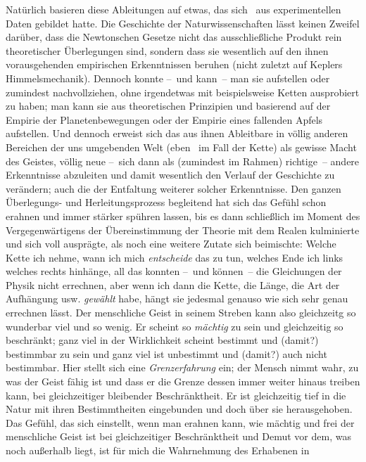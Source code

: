Natürlich basieren diese Ableitungen auf etwas, das sich \ua\ aus
  experimentellen Daten gebildet hatte.
Die Geschichte der Naturwissenschaften lässt keinen Zweifel darüber, dass
  die Newtonschen Gesetze nicht das ausschließliche Produkt rein theoretischer
  Überlegungen sind, sondern dass sie wesentlich auf den ihnen vorausgehenden
  empirischen Erkenntnissen beruhen (nicht zuletzt auf Keplers Himmelsmechanik).
Dennoch konnte --~und kann~-- man sie aufstellen oder zumindest nachvollziehen,
  ohne irgendetwas mit beispielsweise Ketten ausprobiert zu haben; man kann
  sie aus theoretischen Prinzipien und basierend auf der Empirie der
  Planetenbewegungen oder der Empirie eines fallenden Apfels aufstellen.
Und dennoch erweist sich das aus ihnen Ableitbare in völlig anderen Bereichen
  der uns umgebenden Welt (eben \zB\ im Fall der Kette) als gewisse Macht des
  Geistes, völlig neue --~sich dann als (zumindest im Rahmen) richtige~--
  andere Erkenntnisse abzuleiten und damit wesentlich den Verlauf der Geschichte
  zu verändern; auch die der Entfaltung weiterer solcher Erkenntnisse.
Den ganzen Überlegungs- und Herleitungsprozess begleitend hat sich das Gefühl
  schon erahnen und immer stärker spühren lassen, bis es dann schließlich im
  Moment des Vergegenwärtigens der Übereinstimmung der Theorie mit dem Realen
  kulminierte und sich voll ausprägte, als noch eine weitere Zutate sich
  beimischte:
Welche Kette ich nehme, wann ich mich \emph{entscheide} das zu tun, welches
  Ende ich links welches rechts hinhänge, all das konnten --~und können~-- die
  Gleichungen der Physik nicht errechnen, aber wenn ich dann die Kette, die
  Länge, die Art der Aufhängung usw. \emph{gewählt} habe, hängt sie jedesmal
  genauso wie sich sehr genau errechnen lässt.
Der menschliche Geist in seinem Streben kann also gleichzeitg so wunderbar
  viel und so wenig.
Er scheint so \emph{mächtig} zu sein und gleichzeitig so beschränkt; ganz viel
  in der Wirklichkeit scheint bestimmt und (damit?) bestimmbar zu sein und ganz
  viel ist unbestimmt und (damit?) auch nicht bestimmbar.
  Hier stellt sich eine \emph{Grenzerfahrung} ein; der Mensch nimmt wahr, zu was der
  Geist fähig ist und dass er die Grenze dessen immer weiter hinaus treiben
  kann, bei gleichzeitiger bleibender Beschränktheit.
Er ist gleichzeitig tief in die Natur mit ihren Bestimmtheiten eingebunden und
  doch über sie herausgehoben.
Das Gefühl, das sich einstellt, wenn man erahnen kann, wie mächtig und frei der
  menschliche Geist ist bei gleichzeitiger Beschränktheit und Demut vor dem,
  was noch außerhalb liegt, ist für mich die Wahrnehmung des Erhabenen in
